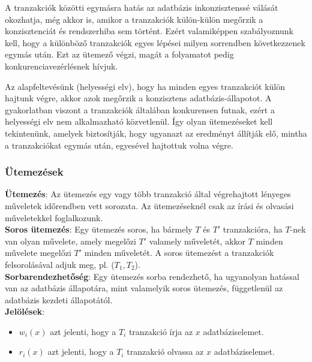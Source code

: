 \documentclass[margin=0px]{article}
\begin{document}
A tranzakciók közötti egymásra hatás az adatbázis inkonzisztenssé válását okozhatja, még akkor is, amikor a tranzakciók külön-külön
megőrzik a konzisztenciát és rendszerhiba sem történt. Ezért valamiképpen szabályoznunk kell, hogy a különböző tranzakciók egyes
lépései milyen sorrendben következzenek egymás után. Ezt az ütemező végzi, magát a folyamatot pedig konkurenciavezérlésnek hívjuk.

Az alapfeltevésünk (helyességi elv), hogy ha minden egyes tranzakciót külön hajtunk végre, akkor azok megőrzik a konzisztens
adatbázis-állapotot. A gyakorlatban viszont a tranzakciók általában konkurensen futnak, ezért a helyességi elv nem
alkalmazható közvetlenül. Így olyan ütemezéseket kell tekintenünk, amelyek biztosítják, hogy ugyanazt az eredményt állítják elő,
mintha a tranzakciókat egymás után, egyesével hajtottuk volna végre.

\subsubsection{Ütemezések}

\noindent \textbf{Ütemezés}: Az ütemezés egy vagy több tranzakció által végrehajtott lényeges műveletek időrendben vett
sorozata. Az ütemezéseknél csak	az írási és olvasási műveletekkel foglalkozunk.\\

\noindent \textbf{Soros ütemezés}: Egy ütemezés soros, ha bármely $T$ és $T'$ tranzakcióra, ha $T$-nek van olyan művelete, amely
megelőzi $T'$ valamely műveletét, akkor $T$ minden művelete megelőzi $T'$ minden műveletét. A soros ütemezést a tranzakciók
felsorolásával adjuk meg, pl. ($T_{1},T_{2}$).\\

\noindent \textbf{Sorbarendezhetőség}: Egy ütemezés sorba rendezhető, ha ugyanolyan hatással van az adatbázis állapotára,
mint valamelyik soros ütemezés, függetlenül az adatbázis kezdeti állapotától.\\

\noindent \textbf{Jelölések}:
\begin{itemize}
    \item	$w_{i}(x)$ azt jelenti, hogy a $T_{i}$ tranzakció írja az $x$ adatbáziselemet.
    \item	$r_{i}(x)$ azt jelenti, hogy a $T_{i}$ tranzakció olvassa az $x$ adatbáziselemet.
\end{itemize}
\end{document}
